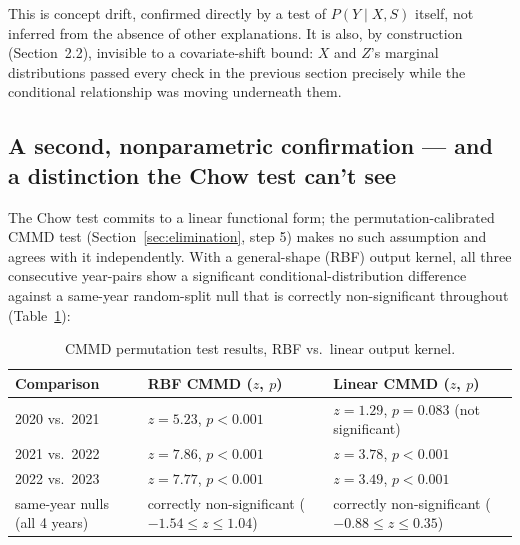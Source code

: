 \documentclass[11pt]{article}
\begin{document}
This is concept drift, confirmed directly by a test of $P(Y\mid X,S)$ itself, not inferred from the absence of other explanations. It is also, by construction (Section~2.2), invisible to a covariate-shift bound: $X$ and $Z$'s marginal distributions passed every check in the previous section precisely while the conditional relationship was moving underneath them.

\subsection{A second, nonparametric confirmation --- and a distinction the Chow test can't see}
\label{sec:cmmd}

The Chow test commits to a linear functional form; the permutation-calibrated CMMD test (Section~\ref{sec:elimination}, step 5) makes no such assumption and agrees with it independently. With a general-shape (RBF) output kernel, all three consecutive year-pairs show a significant conditional-distribution difference against a same-year random-split null that is correctly non-significant throughout (Table~\ref{tab:cmmd}):

\begin{table}[H]
\centering
\caption{CMMD permutation test results, RBF vs.\ linear output kernel.}
\label{tab:cmmd}
\begin{tabular}{@{}p{3.1cm}p{4.6cm}p{4.9cm}@{}}
\toprule
Comparison & RBF CMMD ($z$, $p$) & Linear CMMD ($z$, $p$) \\
\midrule
2020 vs.\ 2021 & $z=5.23$, $p<0.001$ & $z=1.29$, $p=0.083$ (not significant) \\
2021 vs.\ 2022 & $z=7.86$, $p<0.001$ & $z=3.78$, $p<0.001$ \\
2022 vs.\ 2023 & $z=7.77$, $p<0.001$ & $z=3.49$, $p<0.001$ \\
same-year nulls (all 4 years) & correctly non-significant ($-1.54\le z\le1.04$) & correctly non-significant ($-0.88\le z\le0.35$) \\
\bottomrule
\end{tabular}
\end{table}
\end{document}
